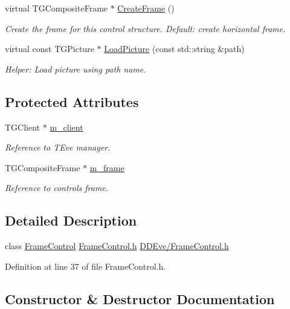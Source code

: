 \begin{DoxyCompactItemize}
virtual T\+G\+Composite\+Frame $\ast$ \hyperlink{class_d_d4hep_1_1_frame_control_a3622593e0da13ddc3719d845782ec7be}{Create\+Frame} ()
\begin{DoxyCompactList}\small\item\em Create the frame for this control structure. Default\+: create horizontal frame. \end{DoxyCompactList}\item 
virtual const T\+G\+Picture $\ast$ \hyperlink{class_d_d4hep_1_1_frame_control_a9c86d20503c0dcf96f5a13bced00ecc0}{Load\+Picture} (const std\+::string \&path)
\begin{DoxyCompactList}\small\item\em Helper\+: Load picture using path name. \end{DoxyCompactList}\end{DoxyCompactItemize}
\subsection*{Protected Attributes}
\begin{DoxyCompactItemize}
\item 
T\+G\+Client $\ast$ \hyperlink{class_d_d4hep_1_1_frame_control_aaca4e5ed19a1982777f7d19bb7dd6a6b}{m\+\_\+client}
\begin{DoxyCompactList}\small\item\em Reference to T\+Eve manager. \end{DoxyCompactList}\item 
T\+G\+Composite\+Frame $\ast$ \hyperlink{class_d_d4hep_1_1_frame_control_aae98fb770d6e50d5df6ed082cd5118ac}{m\+\_\+frame}
\begin{DoxyCompactList}\small\item\em Reference to control\textquotesingle{}s frame. \end{DoxyCompactList}\end{DoxyCompactItemize}


\subsection{Detailed Description}
class \hyperlink{class_d_d4hep_1_1_frame_control}{Frame\+Control} \hyperlink{_frame_control_8h}{Frame\+Control.\+h} \hyperlink{_frame_control_8h}{D\+D\+Eve/\+Frame\+Control.\+h} 

Definition at line 37 of file Frame\+Control.\+h.



\subsection{Constructor \& Destructor Documentation}
\hypertarget{class_d_d4hep_1_1_frame_control_aaecdd9166d4089a7e7892b88f4359126}{}\label{class_d_d4hep_1_1_frame_control_aaecdd9166d4089a7e7892b88f4359126} 
